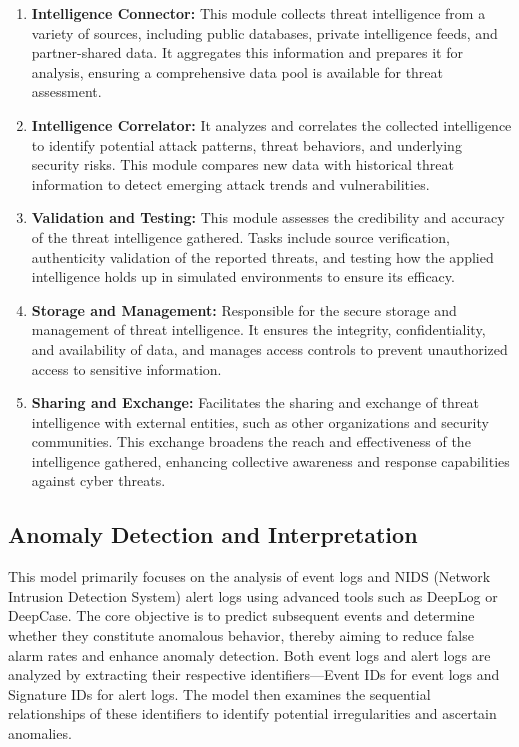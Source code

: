 \begin{enumerate}
    \item \textbf{Intelligence Connector:} This module collects threat intelligence from a variety of sources, including public databases, private intelligence feeds, and partner-shared data. It aggregates this information and prepares it for analysis, ensuring a comprehensive data pool is available for threat assessment.

    \item \textbf{Intelligence Correlator:} It analyzes and correlates the collected intelligence to identify potential attack patterns, threat behaviors, and underlying security risks. This module compares new data with historical threat information to detect emerging attack trends and vulnerabilities.

    \item \textbf{Validation and Testing:} This module assesses the credibility and accuracy of the threat intelligence gathered. Tasks include source verification, authenticity validation of the reported threats, and testing how the applied intelligence holds up in simulated environments to ensure its efficacy.

    \item \textbf{Storage and Management:} Responsible for the secure storage and management of threat intelligence. It ensures the integrity, confidentiality, and availability of data, and manages access controls to prevent unauthorized access to sensitive information.

    \item \textbf{Sharing and Exchange:} Facilitates the sharing and exchange of threat intelligence with external entities, such as other organizations and security communities. This exchange broadens the reach and effectiveness of the intelligence gathered, enhancing collective awareness and response capabilities against cyber threats.
\end{enumerate}

\subsection{Anomaly Detection and Interpretation}
This model primarily focuses on the analysis of event logs and NIDS (Network Intrusion Detection System) alert logs using advanced tools such as DeepLog or DeepCase. The core objective is to predict subsequent events and determine whether they constitute anomalous behavior, thereby aiming to reduce false alarm rates and enhance anomaly detection. Both event logs and alert logs are analyzed by extracting their respective identifiers—Event IDs for event logs and Signature IDs for alert logs. The model then examines the sequential relationships of these identifiers to identify potential irregularities and ascertain anomalies.

